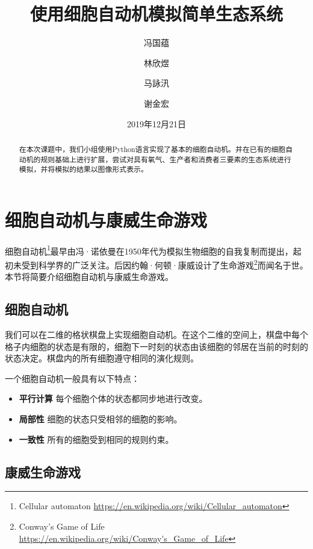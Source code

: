 \documentclass{ctexart}
\author{
	冯国蕴 \and 林欣煜 \and 马詠汛 \and 谢金宏
}
\title{使用细胞自动机模拟简单生态系统}
\date{2019年12月21日}
\begin{document}
\maketitle

\begin{abstract}
在本次课题中，我们小组使用Python语言实现了基本的细胞自动机。并在已有的细胞自动机的规则基础上进行扩展，尝试对具有氧气、生产者和消费者三要素的生态系统进行模拟，并将模拟的结果以图像形式表示。
\end{abstract}

\tableofcontents

\newpage

\listoffigures

\newpage

\section{细胞自动机与康威生命游戏}

细胞自动机\footnote{Cellular automaton \url{https://en.wikipedia.org/wiki/Cellular_automaton}}最早由冯·诺依曼在1950年代为模拟生物细胞的自我复制而提出，起初未受到科学界的广泛关注。后因约翰·何顿·康威设计了生命游戏\footnote{Conway's Game of Life \url{https://en.wikipedia.org/wiki/Conway's_Game_of_Life}}而闻名于世。本节将简要介绍细胞自动机与康威生命游戏。

\subsection{细胞自动机}

我们可以在二维的格状棋盘上实现细胞自动机。在这个二维的空间上，棋盘中每个格子内细胞的状态是有限的，细胞下一时刻的状态由该细胞的邻居在当前的时刻的状态决定。棋盘内的所有细胞遵守相同的演化规则。

一个细胞自动机一般具有以下特点：

\begin{itemize}
  \item \textbf{平行计算 }每个细胞个体的状态都同步地进行改变。
  \item \textbf{局部性 }细胞的状态只受相邻的细胞的影响。
  \item \textbf{一致性 }所有的细胞受到相同的规则约束。
\end{itemize}

\subsection{康威生命游戏}
\end{document}
